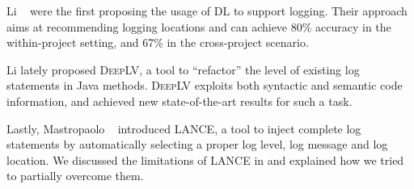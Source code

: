 Li \etal~\cite{li2020shall} were the first proposing the usage of DL to support logging. Their approach aims at recommending logging locations and can achieve 80\% accuracy in the within-project setting, and 67\% in the cross-project scenario.

Li \etal \cite{li2021deeplv} lately proposed \textsc{DeepLV}, a tool to ``refactor'' the level of existing log statements in Java methods. \textsc{DeepLV} exploits both syntactic and semantic code information, and achieved new state-of-the-art results for such a task.

Lastly, Mastropaolo \etal~\cite{mastropaolo2022using} introduced \textsc{LANCE}, a tool to inject complete log statements by automatically selecting a proper log level, log message and log location. We discussed the limitations of \textsc{LANCE} in  and explained how we tried to partially overcome them. 

%
%
%
